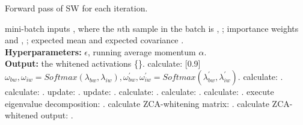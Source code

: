 \documentclass[10pt,twocolumn,letterpaper]{article}
\begin{document}
\begin{algorithm}[t!]
\caption{Forward pass of SW for each iteration.}
	\label{alg:forward}
	{\fontsize{9}{9} \selectfont
		\begin{algorithmic}[1]
			 mini-batch inputs , where the \(n\)th sample in the batch is , ; importance weights  and , ; expected mean  and expected covariance . \\
{\bfseries Hyperparameters:} \(\epsilon\), running average momentum \(\alpha\). \\
{\bfseries Output:} the whitened activations \{\}.
\State calculate: \scalebox{0.8}[0.9]{\( \omega_{bw}, \omega_{iw} = Softmax( \lambda_{bw}, \lambda_{iw}), \omega_{bw}^{\prime}, \omega_{iw}^{\prime} = Softmax( \lambda_{bw}^{\prime}, \lambda_{iw}^{\prime})\)}.
\State calculate: .
\State calculate: .
\State update: .
\State update: .
			\State calculate: .
\State calculate: .
\State calculate: .
\State execute eigenvalue decomposition: .
\State calculate ZCA-whitening matrix: .
\State calculate ZCA-whitened output: .
			\EndFor
		\end{algorithmic}
	}
\end{algorithm}
\end{document}
